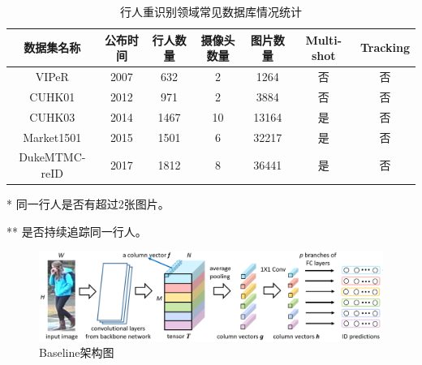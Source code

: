 \begin{table}[]
\centering
\caption{行人重识别领域常见数据库情况统计}
\label{tab:reiddataset}
\begin{threeparttable}
\begin{tabular}{|c|c|c|c|c|c|c|}
\hline
数据集名称         & 公布时间 & 行人数量 & 摄像头数量 & 图片数量  & Multi-shot\tnote{*} & Tracking\tnote{**} \\ \hline
VIPeR         & 2007 & 632  & 2     & 1264  & 否          & 否                  \\ \hline
CUHK01        & 2012 & 971  & 2     & 3884  & 否          & 否                  \\ \hline
CUHK03        & 2014 & 1467 & 10    & 13164 & 是          & 否                  \\ \hline
Market1501    & 2015 & 1501 & 6     & 32217 & 是          & 否                  \\ \hline
DukeMTMC-reID & 2017 & 1812 & 8     & 36441 & 是          & 否                  \\ \hline
\end{tabular}
\begin{tablenotes}
    \footnotesize
    \item[*] 同一行人是否有超过2张图片。
    \item[**] 是否持续追踪同一行人。
\end{tablenotes}
\end{threeparttable}
\end{table}

\begin{figure}
\centering
\includegraphics[width=1\textwidth]{figure/structure}
\caption{Baseline架构图}
\label{fig:baseline}
\end{figure}

